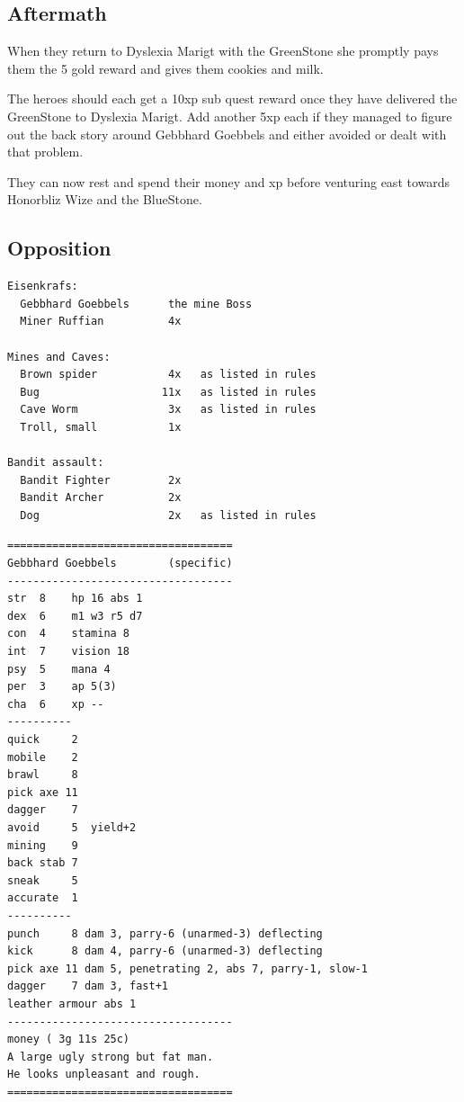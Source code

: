 \subsection*{Aftermath}
When they return to Dyslexia Marigt with the GreenStone she promptly pays them the 5 gold reward and gives them cookies and milk.

The heroes should each get a 10xp sub quest reward once they have delivered the GreenStone to Dyslexia Marigt. Add another 5xp each if they managed to figure out the back story around Gebbhard Goebbels and either avoided or dealt with that problem.

They can now rest and spend their money and xp before venturing east towards Honorbliz Wize and the BlueStone.


\subsection*{Opposition}

\raggedbottom

\begin{samepage} \vsmall \begin{verbatim}
Eisenkrafs:
  Gebbhard Goebbels      the mine Boss
  Miner Ruffian          4x

Mines and Caves:
  Brown spider           4x   as listed in rules
  Bug                   11x   as listed in rules
  Cave Worm              3x   as listed in rules
  Troll, small           1x

Bandit assault:
  Bandit Fighter         2x
  Bandit Archer          2x
  Dog                    2x   as listed in rules
\end{verbatim} \normalsize \end{samepage}



\goodbreak \begin{samepage} \vsmall \begin{verbatim}
===================================
Gebbhard Goebbels        (specific)
-----------------------------------
str  8    hp 16 abs 1
dex  6    m1 w3 r5 d7
con  4    stamina 8
int  7    vision 18
psy  5    mana 4
per  3    ap 5(3)
cha  6    xp --
----------
quick     2
mobile    2
brawl     8
pick axe 11
dagger    7
avoid     5  yield+2
mining    9
back stab 7
sneak     5
accurate  1
----------
punch     8 dam 3, parry-6 (unarmed-3) deflecting
kick      8 dam 4, parry-6 (unarmed-3) deflecting
pick axe 11 dam 5, penetrating 2, abs 7, parry-1, slow-1
dagger    7 dam 3, fast+1
leather armour abs 1
-----------------------------------
money ( 3g 11s 25c)
A large ugly strong but fat man.
He looks unpleasant and rough.
===================================
\end{verbatim} \normalsize \end{samepage}

